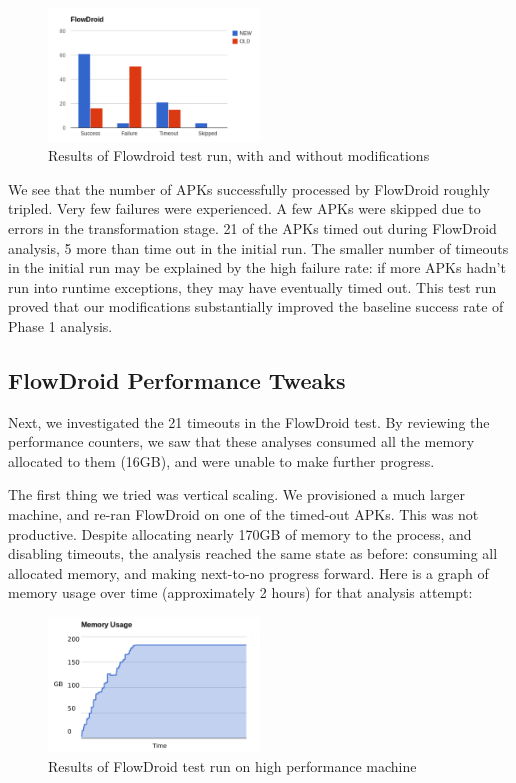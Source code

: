 \begin{figure}[h]
	\centering
	\includegraphics[width=0.50\textwidth]{flowdroid_success.pdf}
	\caption{Results of Flowdroid test run, with and without modifications}
	\label{fig:initial_phase1}
\end{figure}

We see that the number of APKs successfully processed by FlowDroid roughly tripled.   Very few failures were experienced.  A few APKs were skipped due to errors in the transformation stage.  21 of the APKs timed out during FlowDroid analysis, 5 more than time out in the initial run.  The smaller number of timeouts in the initial run may be explained by the high failure rate: if more APKs hadn't run into runtime exceptions, they may have eventually timed out.  This test run proved that our modifications substantially improved the baseline success rate of Phase 1 analysis.

\subsection{FlowDroid Performance Tweaks}
Next, we investigated the 21 timeouts in the FlowDroid test.  By reviewing the performance counters, we saw that these analyses consumed all the memory allocated to them (16GB), and were unable to make further progress.

The first thing we tried was vertical scaling.  We provisioned a much larger machine, and re-ran FlowDroid on one of the timed-out APKs.  This was not productive.  Despite allocating nearly 170GB of memory to the process, and disabling timeouts, the analysis reached the same state as before: consuming all allocated memory, and making next-to-no progress forward.  Here is a graph of memory usage over time (approximately 2 hours) for that analysis attempt:

\begin{figure}[h]
	\centering
	\includegraphics[width=0.50\textwidth]{flowdroid_perf.pdf}
	\caption{Results of FlowDroid test run on high performance machine}
	\label{fig:high_phase1}
\end{figure}

